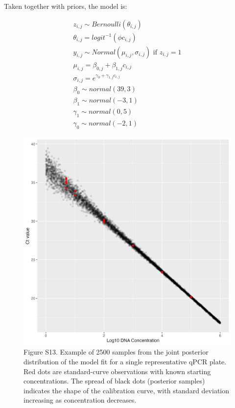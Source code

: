 \documentclass[
]{article}
\begin{document}
Taken together with priors, the model is:

\begin{gather*}
z_{i,j} \sim Bernoulli(\theta_{i,j}) \\
\theta_{i,j} = logit^{-1}(\phi c_{i,j}) \\[4mm]
y_{i,j} \sim Normal(\mu_{i,j}, \sigma_{i,j})   \text{    if } z_{i,j} = 1 \\
\mu_{i,j} = \beta_{0,j} + \beta_{1,j} c_{i,j} \\
\sigma_{i,j} = e^{\gamma_{0}  + \gamma_{1,j} c_{i,j}} \\[4mm]
\beta_{0} \sim normal(39, 3) \\
\beta_{1} \sim normal(-3, 1) \\
\gamma_{1} \sim normal(0,5) \\
\gamma_{0} \sim normal(-2,1)
\end{gather*}

\begin{figure}
\centering
\includegraphics{../Output/SupplementalFigures/qPCR_calibration_supplemental.png}
\caption{Figure S13. Example of 2500 samples from the joint posterior
distribution of the model fit for a single representative qPCR plate.
Red dots are standard-curve observations with known starting
concentrations. The spread of black dots (posterior samples) indicates
the shape of the calibration curve, with standard deviation increasing
as concentration decreases.\label{fig:qpcrmodel}}
\end{figure}
\end{document}
